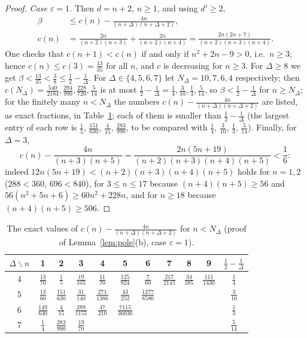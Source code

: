 \documentclass[11pt]{article}
\theoremstyle{definition}
\theoremstyle{remark}
\begin{document}
\begin{proof}
\emph{Case $\varepsilon=1$.} Then $d=n+2$, $n\ge1$, and using $d'\ge2$,
\begin{align*}
 \beta&\le c(n)-\frac{4n}{(n+\Delta)(n+\Delta+2)},\\
 c(n)&=\frac{2n}{(n+2)(n+3)}+\frac{2n}{(n+2)(n+4)}=\frac{2n(2n+7)}{(n+2)(n+3)(n+4)} .
\end{align*}
One checks that $c(n+1)<c(n)$ if and only if $n^2+2n-9>0$, i.e.\ $n\ge3$; hence
$c(n)\le c(3)=\frac{13}{35}$ for all $n$, and $c$ is decreasing for $n\ge3$. For
$\Delta\ge8$ we get $\beta<\frac{13}{35}<\frac38\le\frac12-\frac1\Delta$. For
$\Delta\in\{4,5,6,7\}$ let $N_\Delta=10,7,6,4$ respectively; then
$c(N_\Delta)=\frac{540}{2184},\frac{294}{990},\frac{228}{720},\frac{5}{14}$ is at most
$\frac12-\frac1\Delta=\frac14,\frac3{10},\frac13,\frac5{14}$, so $\beta<\frac12-\frac1\Delta$
for $n\ge N_\Delta$; for the finitely many $n<N_\Delta$ the numbers
$c(n)-\frac{4n}{(n+\Delta)(n+\Delta+2)}$ are listed, as exact fractions, in
Table~\ref{tab:pole}; each of them is smaller than $\frac12-\frac1\Delta$ (the largest entry
of each row is $\frac15$, $\frac{151}{630}$, $\frac4{15}$, $\frac{283}{990}$, to be compared
with $\frac14$, $\frac3{10}$, $\frac13$, $\frac5{14}$). Finally, for $\Delta=3$,
\[
 c(n)-\frac{4n}{(n+3)(n+5)}=\frac{2n(5n+19)}{(n+2)(n+3)(n+4)(n+5)}<\frac16 :
\]
indeed $12n(5n+19)<(n+2)(n+3)(n+4)(n+5)$ holds for $n=1,2$ ($288<360$, $696<840$), for
$3\le n\le17$ because $(n+4)(n+5)\ge56$ and $56(n^2+5n+6)\ge60n^2+228n$, and for $n\ge18$
because $(n+4)(n+5)\ge506$.
\end{proof}

\begin{table}[h]
\centering
\renewcommand{\arraystretch}{1.35}
\begin{tabular}{@{}c|ccccccccc|c@{}}
\toprule
$\Delta\backslash n$ & 1&2&3&4&5&6&7&8&9& $\frac12-\frac1\Delta$\\
\midrule
4 & $\frac{13}{70}$ & $\frac{1}{5}$ & $\frac{19}{105}$ & $\frac{11}{70}$ & $\frac{125}{924}$ & $\frac{7}{60}$ & $\frac{217}{2145}$ & $\frac{34}{385}$ & $\frac{111}{1430}$ &$\frac14$\\
5 & $\frac{13}{60}$ & $\frac{151}{630}$ & $\frac{31}{140}$ & $\frac{271}{1386}$ & $\frac{43}{252}$ & $\frac{1277}{8580}$ & & & &$\frac3{10}$\\
6 & $\frac{149}{630}$ & $\frac{4}{15}$ & $\frac{289}{1155}$ & $\frac{47}{210}$ & $\frac{7115}{36036}$ & & & & &$\frac13$\\
7 & $\frac{1}{4}$ & $\frac{283}{990}$ & $\frac{19}{70}$ & & & & & & &$\frac5{14}$\\
\bottomrule
\end{tabular}
\caption{The exact values of $c(n)-\frac{4n}{(n+\Delta)(n+\Delta+2)}$ for $n<N_\Delta$ (proof
of Lemma~\ref{lem:pole}(b), case $\varepsilon=1$).}\label{tab:pole}
\end{table}
\end{document}
